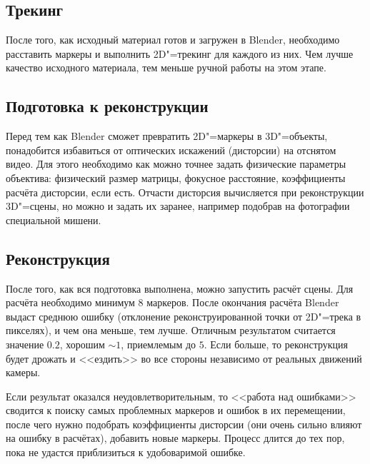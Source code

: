 \documentclass[10pt, a5paper]{article}
\begin{document}
\subsection*{Трекинг}

После того, как исходный материал готов и загружен в Blender, необходимо расставить маркеры и выполнить 2D"=трекинг для каждого из них. Чем лучше качество исходного материала, тем меньше ручной работы на этом этапе.

\subsection*{Подготовка к реконструкции}

Перед тем как Blender сможет превратить 2D"=маркеры в 3D"=объекты, понадобится избавиться от оптических искажений (дисторсии) на отснятом видео. Для этого необходимо как можно точнее задать физические параметры объектива: физический размер матрицы, фокусное расстояние, коэффициенты расчёта дисторсии, если есть. Отчасти дисторсия вычисляется при реконструкции 3D"=сцены, но можно и задать их заранее, например подобрав на фотографии специальной мишени.

\subsection*{Реконструкция}

После того, как вся подготовка выполнена, можно запустить расчёт сцены. Для расчёта необходимо минимум 8 маркеров. После окончания расчёта Blender выдаст среднюю ошибку (отклонение реконструированной точки от 2D"=трека в пикселях), и чем она меньше, тем лучше. Отличным результатом считается значение $0.2$, хорошим $\sim 1$, приемлемым до $5$. Если больше, то реконструкция будет дрожать и <<ездить>> во все стороны независимо от реальных движений камеры.

Если результат оказался неудовлетворительным, то <<работа над ошибками>> сводится к поиску самых проблемных маркеров и ошибок в их перемещении, после чего нужно подобрать коэффициенты дисторсии (они очень сильно влияют на ошибку в расчётах), добавить новые маркеры. Процесс длится до тех пор, пока не удастся приблизиться к удобоваримой ошибке.
\end{document}
